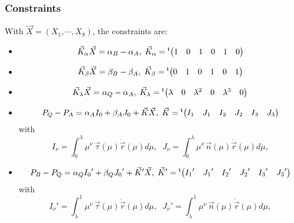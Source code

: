 \documentclass[11pt]{amsart}
\newcommand{\mytrn}[1]{{\!\!~^{\mathsf{t}}{#1}}}
\begin{document}
\subsubsection{Constraints}
With $\vec{X}=\left(X_1,\cdots,X_8\right)$, the constraints are:
\begin{itemize}
\item
\[
	\vec{K}_\alpha\vec{X} = \alpha_B-\alpha_A, \; \vec{K}_\alpha= \mytrn{\begin{pmatrix} 1 & 0 & 1 & 0 & 1 & 0\cr \end{pmatrix}}
\]
\item
\[
	\vec{K}_\beta\vec{X} = \beta_B-\beta_A, \; \vec{K}_\beta= \mytrn{\begin{pmatrix} 0 & 1 & 0 & 1 & 0 & 1\cr \end{pmatrix}}
\]
\item
\[
	\vec{K}_\lambda\vec{X} = \alpha_Q-\alpha_A, \;\vec{K}_\lambda= \mytrn{\begin{pmatrix} \lambda & 0 & \lambda^2 & 0 & \lambda^3 & 0\cr \end{pmatrix}}
 \]
 \item
 \[
 P_Q-P_A = \alpha_A I_0 + \beta_A J_0 + \vec{K}\vec{X},
 \;\vec{K} = \mytrn{\begin{pmatrix} I_1 & J_1 & I_2 & J_2 & I_3 & J_3\cr \end{pmatrix}}
 \]
 with
 \[
 	I_\nu = \int_0^\lambda \mu^\nu\, \vec{\tau}(\mu)\dot{\vec{r}}(\mu) d\mu,\;\;
 	J_\nu = \int_0^\lambda \mu^\nu\, \vec{n}(\mu)\dot{\vec{r}}(\mu) d\mu,
 \]
 \item
 \[
 P_B-P_Q = \alpha_Q {I_0}' + \beta_Q {J_0}' + \vec{K}'\vec{X},
 \;\vec{K}' = \mytrn{\begin{pmatrix} {I_1}' & {J_1}' & {I_2}' & {J_2}' & {I_3}' & {J_3}'\cr \end{pmatrix}}
 \]
 with
 \[
 	{I_\nu}' = \int_\lambda^1 \mu^\nu\, \vec{\tau}(\mu)\dot{\vec{r}}(\mu) d\mu,\;\;
 	{J_\nu}' = \int_\lambda^1 \mu^\nu\, \vec{n}(\mu)\dot{\vec{r}}(\mu) d\mu,
 \]
 \end{itemize}
\end{document}
